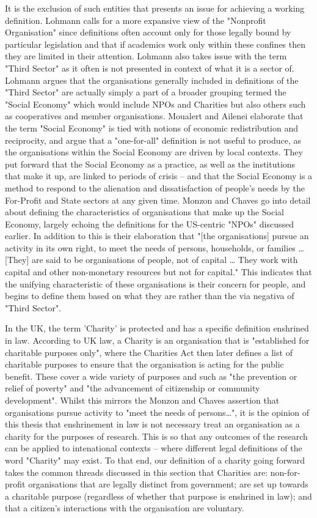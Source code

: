 It is the exclusion of such entities that presents an issue for achieving a working definition. Lohmann calls for a more expansive view of the "Nonprofit Organisation" since definitions often account only for those legally bound by particular legislation and that if academics work only within these confines then they are limited in their attention. Lohmann also takes issue with the term "Third Sector" as it often is not presented in context of what it is a sector of. Lohmann argues that the organisations generally included in definitions of the "Third Sector" are actually simply a part of a broader grouping termed the "Social Economy" which would include NPOs and Charities but also others such as cooperatives and member organisations. Moualert and Ailenei elaborate that the term "Social Economy" is tied with notions of economic redistribution and reciprocity, and argue that a "one-for-all" definition is not useful to produce, as the organisations within the Social Economy are driven by local contexts. They put forward that the Social Economy as a practice, as well as the institutions that make it up, are linked to periods of crisis -- and that the Social Economy is a method to respond to the alienation and dissatisfaction of people's needs by the For-Profit and State sectors at any given time. Monzon and Chaves go into detail about defining the characteristics of organisations that make up the Social Economy, largely echoing the definitions for the US-centric "NPOs" discussed earlier. In addition to this is their elaboration that "[the organisations] pursue an activity in its own right, to meet the needs of persons, households, or families … [They] are said to be organisations of people, not of capital … They work with capital and other non-monetary resources but not for capital." This indicates that the unifying characteristic of these organisations is their concern for people, and begins to define them based on what they are rather than the via negativa of "Third Sector".

In the UK, the term 'Charity' is protected and has a specific definition enshrined in law. According to UK law, a Charity is an organisation that is "established for charitable purposes only", where the Charities Act then later defines a list of charitable purposes to ensure that the organisation is acting for the public benefit. These cover a wide variety of purposes and such as "the prevention or relief of poverty" and "the advancement of citizenship or community development". Whilst this mirrors the Monzon and Chaves assertion that organisations pursue activity to "meet the needs of persons…", it is the opinion of this thesis that enshrinement in law is not necessary treat an organisation as a charity for the purposes of research. This is so that any outcomes of the research can be applied to intenational contexts -- where different legal definitions of the word "Charity" may exist. To that end, our definition of a charity going forward takes the common threads discussed in this section that Charities are: non-for-profit organisations that are legally distinct from government; are set up towards a charitable purpose (regardless of whether that purpose is enshrined in law); and that a citizen's interactions with the organisation are voluntary.


